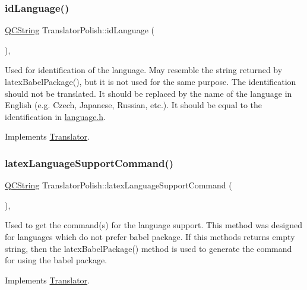 \subsubsection{\texorpdfstring{idLanguage()}{idLanguage()}}
{\footnotesize\ttfamily \mbox{\hyperlink{class_q_c_string}{Q\+C\+String}} Translator\+Polish\+::id\+Language (\begin{DoxyParamCaption}{ }\end{DoxyParamCaption})\hspace{0.3cm}{\ttfamily [inline]}, {\ttfamily [virtual]}}

Used for identification of the language. May resemble the string returned by latex\+Babel\+Package(), but it is not used for the same purpose. The identification should not be translated. It should be replaced by the name of the language in English (e.\+g. Czech, Japanese, Russian, etc.). It should be equal to the identification in \mbox{\hyperlink{language_8h_source}{language.\+h}}. 

Implements \mbox{\hyperlink{class_translator}{Translator}}.

\mbox{\label{class_translator_polish_ac5c8175efc27b8661a046f601843dec9}} 
\subsubsection{\texorpdfstring{latexLanguageSupportCommand()}{latexLanguageSupportCommand()}}
{\footnotesize\ttfamily \mbox{\hyperlink{class_q_c_string}{Q\+C\+String}} Translator\+Polish\+::latex\+Language\+Support\+Command (\begin{DoxyParamCaption}{ }\end{DoxyParamCaption})\hspace{0.3cm}{\ttfamily [inline]}, {\ttfamily [virtual]}}

Used to get the command(s) for the language support. This method was designed for languages which do not prefer babel package. If this methods returns empty string, then the latex\+Babel\+Package() method is used to generate the command for using the babel package. 

Implements \mbox{\hyperlink{class_translator}{Translator}}.

\mbox{\label{class_translator_polish_a0561314fe0b9d59cb731d64e8ed55de2}} 
